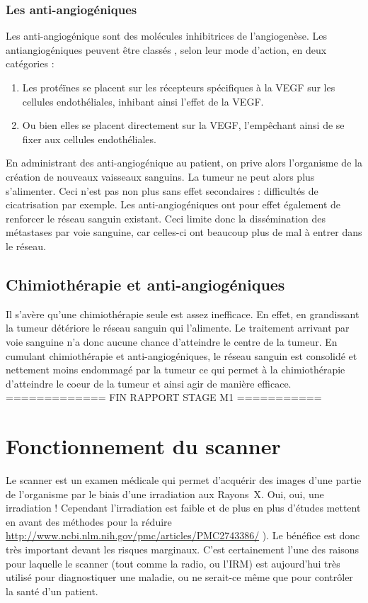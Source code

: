 \documentclass[main.tex]{subfiles}
\begin{document}
\subsubsection{Les anti-angiogéniques}\label{trait antiangio}
Les anti-angiogénique sont des molécules inhibitrices de l'angiogenèse. Les antiangiogéniques peuvent être classés , selon leur mode d'action, en deux catégories :
\begin{enumerate}
\item Les protéïnes se placent sur les récepteurs spécifiques à la VEGF sur les cellules endothéliales, inhibant ainsi l'effet de la VEGF.
\item Ou bien elles se placent directement sur la VEGF, l'empêchant ainsi de se fixer aux cellules endothéliales.
\end{enumerate}
 En administrant des anti-angiogénique au patient, on prive alors l'organisme de la création de nouveaux vaisseaux sanguins. La tumeur ne peut alors plus s'alimenter. Ceci n'est pas non plus sans effet secondaires : difficultés de cicatrisation par exemple. Les anti-angiogéniques ont pour effet également de renforcer le réseau sanguin existant. Ceci limite donc la dissémination des métastases par voie sanguine, car celles-ci ont beaucoup plus de mal à entrer dans le réseau.

\subsection{Chimiothérapie et anti-angiogéniques}
Il s'avère qu'une chimiothérapie seule est assez inefficace. En effet, en grandissant la tumeur détériore le réseau sanguin qui l'alimente. Le traitement arrivant par voie sanguine n'a donc aucune chance d'atteindre le centre de la tumeur. En cumulant chimiothérapie et anti-angiogéniques, le réseau sanguin est consolidé et nettement moins endommagé par la tumeur ce qui permet à la chimiothérapie d'atteindre le coeur de la tumeur et ainsi agir de manière efficace.\\
=============   FIN RAPPORT STAGE M1  ===========\\


\section{Fonctionnement du scanner}
Le scanner est un examen médicale qui permet d'acquérir des images d'une partie de l'organisme par le biais d'une irradiation aux Rayons~X. Oui, oui, une irradiation ! Cependant l'irradiation est faible et de plus en plus d'études mettent en avant des méthodes pour la réduire  \url{http://www.ncbi.nlm.nih.gov/pmc/articles/PMC2743386/} ). Le bénéfice est donc très important devant les risques marginaux. C'est certainement l'une des raisons pour laquelle le scanner (tout comme la radio, ou l'IRM) est aujourd'hui très utilisé pour diagnostiquer une maladie, ou ne serait-ce même que pour contrôler la santé d'un patient.
\end{document}
